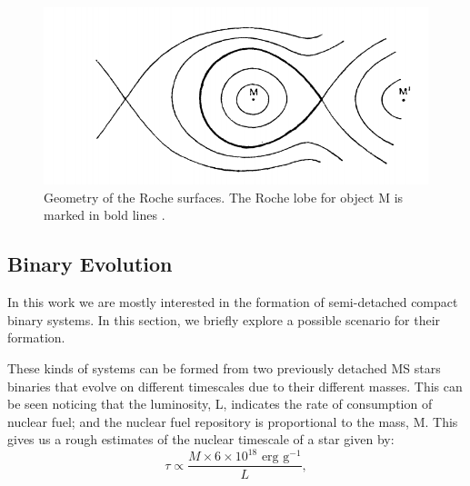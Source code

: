 \begin{figure}[]
        \centering
\includegraphics[scale=.3]{assets/images/kopalroche.png}
\caption{Geometry of the Roche surfaces. The Roche lobe for object M is marked in bold lines \citep{kopal_close_1959}.}
\label{fig:roche1}
\end{figure}


\subsection{Binary Evolution}

In this work we are mostly interested in the formation of semi-detached compact binary systems. In this section, we briefly explore a possible scenario for their formation. 

These kinds of systems can be formed from two previously detached MS stars binaries that evolve on different timescales due to their different masses. This can be seen noticing that the luminosity, L, indicates the rate of consumption of nuclear fuel; and the nuclear fuel repository is proportional to the mass, M. This gives us a rough estimates of the nuclear timescale of a star given by: \\ 

\begin{equation}
        \tau \propto \frac{ M \times 6 \times 10^{18} \text{ erg g}^{-1}}{L},
\end{equation}

